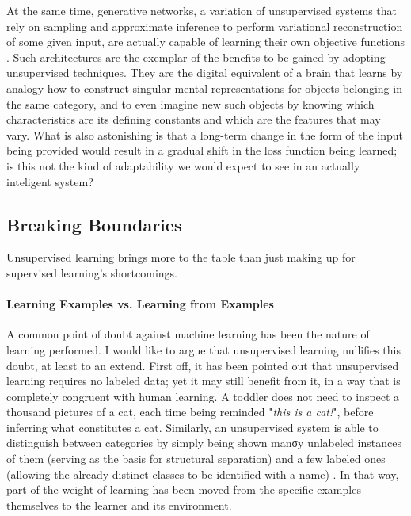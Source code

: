 \documentclass[]{article}
\begin{document}
At the same time, generative networks, a variation of unsupervised systems that rely on sampling and approximate inference to perform variational reconstruction of some given input, are actually capable of learning their own objective functions \cite{goodfellow2014generative, kingma2013auto}. Such architectures are the exemplar of the benefits to be gained by adopting unsupervised techniques. They are the digital equivalent of a brain that learns by analogy how to construct singular mental representations for objects belonging in the same category, and to even imagine new such objects by knowing which characteristics are its defining constants and which are the features that may vary. What is also astonishing is that a long-term change in the form of the input being provided would result in a gradual shift in the loss function being learned; is this not the kind of adaptability we would expect to see in an actually inteligent system?

\subsection{Breaking Boundaries}
Unsupervised learning brings more to the table than just making up for supervised learning's shortcomings. 

\paragraph{Learning Examples vs. Learning from Examples} A common point of doubt against machine learning has been the nature of learning performed. I would like to argue that unsupervised learning nullifies this doubt, at least to an extend. First off, it has been pointed out that unsupervised learning requires no labeled data; yet it may still benefit from it, in a way that is completely congruent with human learning. A toddler does not need to inspect a thousand pictures of a cat, each time being reminded "\textit{this is a cat!}", before inferring what constitutes a cat. Similarly, an unsupervised system is able to distinguish between categories by simply being shown manσy unlabeled instances of them (serving as the basis for structural separation) and a few labeled ones (allowing the already distinct classes to be identified with a name) \cite{Fei-Fei:2006:OLO:1115692.1115783}. In that way, part of the weight of learning has been moved from the specific examples themselves to the learner and its environment.
\end{document}
